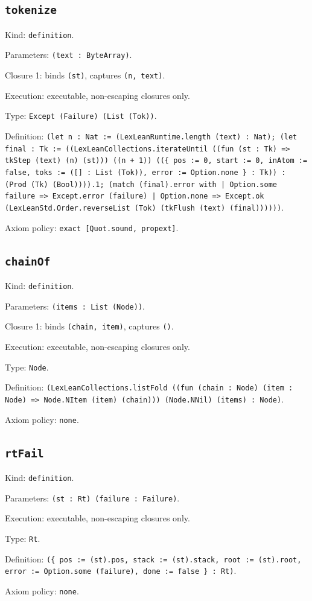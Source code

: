 \documentclass[11pt]{article}
\begin{document}
\subsection*{\texttt{tokenize}}
\noindent Kind: \texttt{definition}.\par
\noindent Parameters: \texttt{(text : ByteArray)}.\par
\noindent Closure 1: binds \texttt{(st)}, captures \texttt{(n, text)}.\par
\noindent Execution: executable, non-escaping closures only.\par
\noindent Type: \texttt{Except (Failure) (List (Tok))}.\par
\noindent Definition: \texttt{(let n : Nat := (LexLeanRuntime.length (text) : Nat); (let final : Tk := ((LexLeanCollections.iterateUntil ((fun (st : Tk) => tkStep (text) (n) (st))) ((n + 1)) ((\{ pos := 0, start := 0, inAtom := false, toks := ([] : List (Tok)), error := Option.none \} : Tk)) : (Prod (Tk) (Bool)))).1; (match (final).error with | Option.some failure => Except.error (failure) | Option.none => Except.ok (LexLeanStd.Order.reverseList (Tok) (tkFlush (text) (final))))))}.\par
\noindent Axiom policy: \texttt{exact [Quot.sound, propext]}.\par
\subsection*{\texttt{chainOf}}
\noindent Kind: \texttt{definition}.\par
\noindent Parameters: \texttt{(items : List (Node))}.\par
\noindent Closure 1: binds \texttt{(chain, item)}, captures \texttt{()}.\par
\noindent Execution: executable, non-escaping closures only.\par
\noindent Type: \texttt{Node}.\par
\noindent Definition: \texttt{(LexLeanCollections.listFold ((fun (chain : Node) (item : Node) => Node.NItem (item) (chain))) (Node.NNil) (items) : Node)}.\par
\noindent Axiom policy: \texttt{none}.\par
\subsection*{\texttt{rtFail}}
\noindent Kind: \texttt{definition}.\par
\noindent Parameters: \texttt{(st : Rt) (failure : Failure)}.\par
\noindent Execution: executable, non-escaping closures only.\par
\noindent Type: \texttt{Rt}.\par
\noindent Definition: \texttt{(\{ pos := (st).pos, stack := (st).stack, root := (st).root, error := Option.some (failure), done := false \} : Rt)}.\par
\noindent Axiom policy: \texttt{none}.\par
\end{document}
